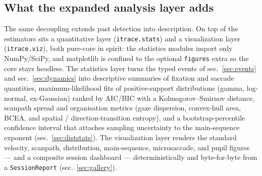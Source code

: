 \documentclass[
]{article}
\begin{document}
\subsection{What the expanded analysis layer
adds}\label{what-the-expanded-analysis-layer-adds}

The same decoupling extends past detection into description. On top of
the estimators sits a quantitative layer (\texttt{itrace.stats}) and a
visualization layer (\texttt{itrace.viz}), both pure-core in spirit: the
statistics modules import only NumPy/SciPy, and matplotlib is confined
to the optional \texttt{figures} extra so the core stays headless. The
statistics layer turns the typed events of sec.~\ref{sec:events} and
sec.~\ref{sec:dynamics} into descriptive summaries of fixation and
saccade quantities, maximum-likelihood fits of positive-support
distributions (gamma, log-normal, ex-Gaussian) ranked by AIC/BIC with a
Kolmogorov--Smirnov distance, scanpath spread and organisation metrics
(gaze dispersion, convex-hull area, BCEA, and spatial /
direction-transition entropy), and a bootstrap-percentile confidence
interval that attaches sampling uncertainty to the main-sequence
exponent (sec.~\ref{sec:diststats}). The visualization layer renders the
standard velocity, scanpath, distribution, main-sequence, microsaccade,
and pupil figures --- and a composite session dashboard ---
deterministically and byte-for-byte from a \texttt{SessionReport}
(sec.~\ref{sec:gallery}).
\end{document}
